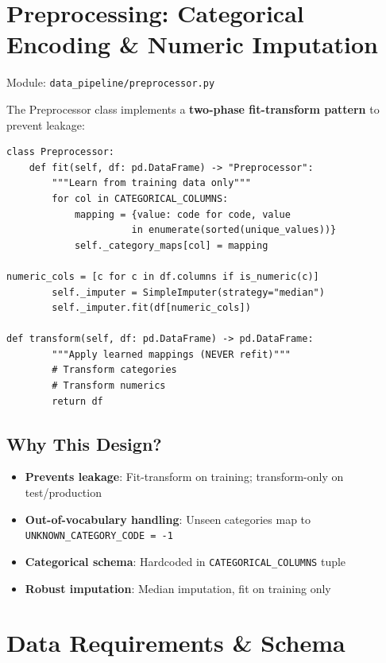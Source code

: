 \documentclass[11pt,a4paper,oneside]{report}
\begin{document}
\section{Preprocessing: Categorical Encoding \& Numeric Imputation}

Module: \texttt{data\_pipeline/preprocessor.py}

The Preprocessor class implements a \textbf{two-phase fit-transform pattern} to prevent leakage:

\begin{lstlisting}
class Preprocessor:
    def fit(self, df: pd.DataFrame) -> "Preprocessor":
        """Learn from training data only"""
        for col in CATEGORICAL_COLUMNS:
            mapping = {value: code for code, value 
                      in enumerate(sorted(unique_values))}
            self._category_maps[col] = mapping

numeric_cols = [c for c in df.columns if is_numeric(c)]
        self._imputer = SimpleImputer(strategy="median")
        self._imputer.fit(df[numeric_cols])

def transform(self, df: pd.DataFrame) -> pd.DataFrame:
        """Apply learned mappings (NEVER refit)"""
        # Transform categories
        # Transform numerics
        return df
\end{lstlisting}

\subsection{Why This Design?}

\begin{itemize}
    \item \textbf{Prevents leakage}: Fit-transform on training; transform-only on test/production
    \item \textbf{Out-of-vocabulary handling}: Unseen categories map to \texttt{UNKNOWN\_CATEGORY\_CODE = -1}
    \item \textbf{Categorical schema}: Hardcoded in \texttt{CATEGORICAL\_COLUMNS} tuple
    \item \textbf{Robust imputation}: Median imputation, fit on training only
\end{itemize}

\section{Data Requirements \& Schema}
\end{document}
